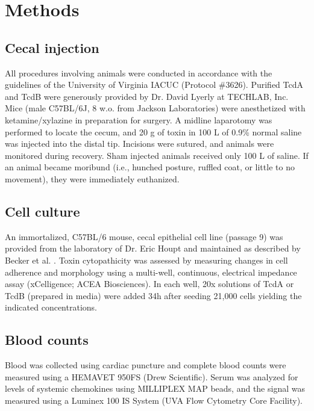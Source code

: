 \section{Methods}

\subsection{ Cecal injection }
All procedures involving animals were conducted in accordance with the 
guidelines of the University of Virginia IACUC (Protocol \#3626). Purified 
TcdA and TcdB were generously provided by Dr. David Lyerly at TECHLAB, Inc. 
Mice (male C57BL/6J, 8 w.o. from Jackson Laboratories) were anesthetized 
with ketamine/xylazine in preparation for surgery. A midline laparotomy 
was performed to locate the cecum, and 20 \textmugreek{}g of toxin in 100 \textmugreek{}L of 0.9\% 
normal saline was injected into the distal tip. Incisions were sutured, 
and animals were monitored during recovery. Sham injected animals received 
only 100 \textmugreek{}L of saline. If an animal became moribund (i.e., hunched 
posture, ruffled coat, or little to no movement), they were immediately euthanized. 

\subsection{ Cell culture }
An immortalized, C57BL/6 mouse, cecal epithelial cell line (passage 9) 
was provided from the laboratory of Dr. Eric Houpt and maintained as 
described by Becker et al. \cite{Becker:2010io}. Toxin cytopathicity 
was assessed by measuring changes in cell adherence and morphology 
using a multi-well, continuous, electrical impedance assay (xCelligence; 
ACEA Biosciences). In each well, 20x solutions of TcdA or TcdB (prepared 
in media) were added 34h after seeding 21,000 cells yielding the indicated concentrations.

\subsection{ Blood counts }
Blood was collected using cardiac puncture and complete blood counts were 
measured using a HEMAVET 950FS (Drew Scientific). Serum was analyzed for 
levels of systemic chemokines using MILLIPLEX MAP beads, and the signal 
was measured using a Luminex 100 IS System (UVA Flow Cytometry Core Facility).


